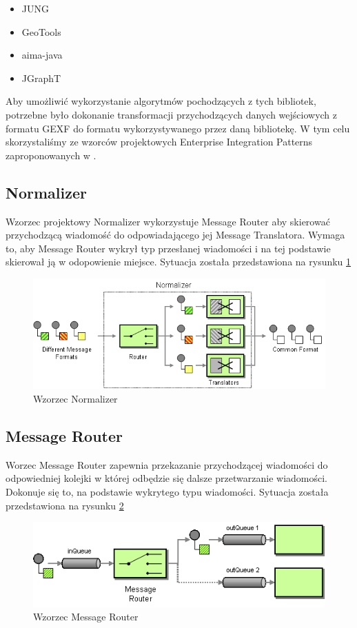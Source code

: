 \begin{itemize}
 \item JUNG
 \item GeoTools
 \item aima-java
 \item JGraphT
\end{itemize}

Aby umożliwić wykorzystanie algorytmów pochodzących z tych bibliotek, potrzebne było dokonanie transformacji przychodzących danych wejściowych z
formatu GEXF do formatu wykorzystywanego przez daną bibliotekę.
W tym celu skorzystaliśmy ze wzorców projektowych Enterprise Integration Patterns zaproponowanych w \cite{hohpe2004enterprise}.

\subsection{Normalizer}
Wzorzec projektowy Normalizer wykorzystuje Message Router aby skierować przychodzącą wiadomość do odpowiadającego jej Message Translatora.
Wymaga to, aby Message Router wykrył typ przesłanej wiadomości i na tej podstawie skierował ją w odopowienie miejsce.
Sytuacja została przedstawiona na rysunku \ref{fig:normalizer}

\begin{figure}[!h]
 \centering
 \includegraphics[width=1.0\textwidth]{eip/Normalizer}
 \caption{Wzorzec Normalizer}
 \label{fig:normalizer}
\end{figure}

\subsection{Message Router}
Worzec Message Router zapewnia przekazanie przychodzącej wiadomości do odpowiedniej kolejki w której odbędzie się dalsze przetwarzanie wiadomości.
Dokonuje się to, na podstawie wykrytego typu wiadomości.
Sytuacja została przedstawiona na rysunku \ref{fig:messageRouter}

\begin{figure}[!h]
 \centering
 \includegraphics[width=1.0\textwidth]{eip/MessageRouter}
 \caption{Wzorzec Message Router}
 \label{fig:messageRouter}
\end{figure}

